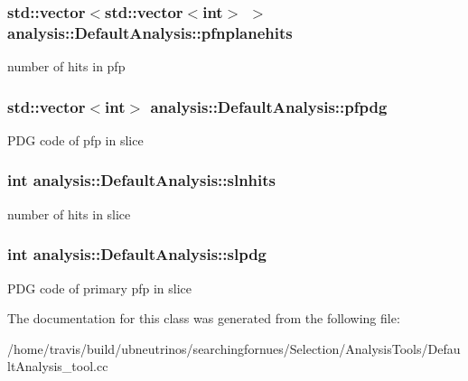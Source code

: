 \subsubsection[{\texorpdfstring{pfnplanehits}{pfnplanehits}}]{\setlength{\rightskip}{0pt plus 5cm}std\+::vector$<$std\+::vector$<$int$>$ $>$ analysis\+::\+Default\+Analysis\+::pfnplanehits\hspace{0.3cm}{\ttfamily [private]}}\hypertarget{classanalysis_1_1DefaultAnalysis_a868edc3f02a7f71619edef7ee0d3df5c}{}\label{classanalysis_1_1DefaultAnalysis_a868edc3f02a7f71619edef7ee0d3df5c}
number of hits in pfp 
\subsubsection[{\texorpdfstring{pfpdg}{pfpdg}}]{\setlength{\rightskip}{0pt plus 5cm}std\+::vector$<$int$>$ analysis\+::\+Default\+Analysis\+::pfpdg\hspace{0.3cm}{\ttfamily [private]}}\hypertarget{classanalysis_1_1DefaultAnalysis_a5d3ad6cd0930367cafe48e485aa19d20}{}\label{classanalysis_1_1DefaultAnalysis_a5d3ad6cd0930367cafe48e485aa19d20}
P\+DG code of pfp in slice 
\subsubsection[{\texorpdfstring{slnhits}{slnhits}}]{\setlength{\rightskip}{0pt plus 5cm}int analysis\+::\+Default\+Analysis\+::slnhits\hspace{0.3cm}{\ttfamily [private]}}\hypertarget{classanalysis_1_1DefaultAnalysis_a9f003b22425d9db3b27eabee64700028}{}\label{classanalysis_1_1DefaultAnalysis_a9f003b22425d9db3b27eabee64700028}
number of hits in slice 
\subsubsection[{\texorpdfstring{slpdg}{slpdg}}]{\setlength{\rightskip}{0pt plus 5cm}int analysis\+::\+Default\+Analysis\+::slpdg\hspace{0.3cm}{\ttfamily [private]}}\hypertarget{classanalysis_1_1DefaultAnalysis_a9763429d7ed32c67e96d981d14893c06}{}\label{classanalysis_1_1DefaultAnalysis_a9763429d7ed32c67e96d981d14893c06}
P\+DG code of primary pfp in slice 

The documentation for this class was generated from the following file\+:\begin{DoxyCompactItemize}
\item 
/home/travis/build/ubneutrinos/searchingfornues/\+Selection/\+Analysis\+Tools/Default\+Analysis\+\_\+tool.\+cc\end{DoxyCompactItemize}
